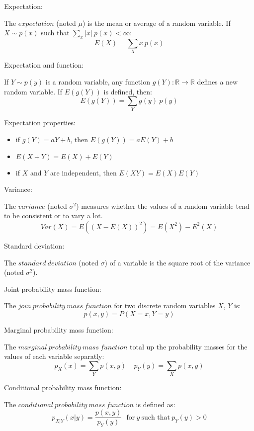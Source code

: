 \documentclass{article}
\begin{document}
Expectation:


The $expectation$ (noted $\mu$) is the mean or average of a random variable. If $X \sim p(x)$ such that $\sum_x |x|\ p(x) < \infty$:
\[
    E(X) = \sum_X x\ p(x)
\]

Expectation and function:


If $Y \sim p(y)$ is a random variable, any function $g(Y): \mathbb{R} \rightarrow \mathbb{R}$ defines a new random variable. If $E(g(Y))$ is defined, then:
\[
    E(g(Y)) = \sum_Y g(y)\ p(y)
\]




Expectation properties:


\begin{itemize}
\item if $g(Y) = a Y + b$, then $E(g(Y)) = a E(Y) + b$
\item $E(X + Y)  = E(X) + E(Y)$
\item if $X$ and $Y$ are independent, then $E(X Y) = E(X) E(Y)$
\end{itemize}




Variance:


The $variance$ (noted $\sigma^2$) measures whether the values of a random variable tend to be consistent or to vary a lot.
\[
    Var(X) = E((X - E(X))^2) = E(X^2) - E^2(X)
\]




Standard deviation:


The $standard\ deviation$ (noted $\sigma$) of a variable is the square root of the variance (noted $\sigma^2$).




Joint probability mass function:


The $join\ probability\ mass\ function$ for two discrete random variables $X$, $Y$ is:
\[
    p(x,y) = P(X=x, Y=y)
\]




Marginal probability mass function:


The $marginal\ probability\ mass\ function$ total up the probability masses for the values of each variable separatly:
\[
    p_X (x) = \sum_Y p(x,y) \;\;\;\;  p_Y (y) = \sum_X p(x,y)
\]




Conditional probability mass function:


The $conditional\ probability\ mass\ function$ is defined as:
\[
    p_{X|Y}(x|y) = \frac{p(x,y)}{p_Y (y)} \ \ \ \text{for}\ y\ \text{such that}\ p_Y (y) > 0
\]
\end{document}

